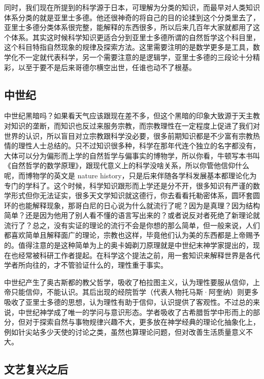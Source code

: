 \documentclass[]{tufte-book}
\begin{document}
同时，我们现在所提到的科学源于日本，可理解为分类的知识，而最早对人类知识体系分类的就是亚里士多德。他还很神奇的将自己的目的论揉到这个分类里去了，亚里士多德分类体系很完整，能解释的东西很多，所以后来几百年大家就都用了这个体系。其实这时候科学知识更适合分到亚里士多德所谓的自然哲学这个科目里，这个科目特指自然现象的规律及探索方法。这里需要注明的是数学更多是工具，数学化不一定就代表科学，另一个需要注意的是逻辑学，亚里士多德的三段论十分精彩，以至于要不是后来哥德尔横空出世，任谁也动不了根基。

\hypertarget{ux4e2dux4e16ux7eaa}{%
\subsection{中世纪}\label{ux4e2dux4e16ux7eaa}}

中世纪黑暗吗？如果看天气应该跟现在差不多，但这个黑暗的印象大致源于天主教对知识的垄断，而知识也反过来服务宗教，而宗教理性在一定程度上促进了我们对世界的认识，所以盲目对立宗教跟科学没必要，很多前期知识都是不少富有宗教热情的理性人士总结的。只不过知识很多种，科学在那年代连个独立的名字都没有，大体可以分为偏形而上学的自然哲学与偏事实的博物学，所以你看，牛顿写本书叫《自然哲学的数学原理》，跟现代意义上的科学没啥关系，所以你管他信仰什么呢，而博物学的英文是 nature history，只是后来伴随各学科发展基本都理论化为专门的学科了。这个时候，科学知识跟形而上学还是分不开，很多知识有严谨的数学形式但你无法证实，很多天文学知识就这德行，你去看看托勒密体系，圆环套圆环的也能解释现象，那哥白尼的日心说为什么就流行了呢？因为是真理？因为结构简单？还是因为他用了别人看不懂的语言写出来的？或者说反对者死绝了新理论就流行了？总之，没有实证的理论的流行不会是你想的那么简单，但一般来说，人们都喜欢简单且解释面广的理论，宗教也这样，毕竟他们认为美的东西都是上帝赐予的。值得注意的是这种简单为上的奥卡姆剃刀原理就是中世纪末神学家提出的，现在也经常被科研工作者提起。在科学这个提法之前，用一套知识来解释世界是各代学者所向往的，才不管验证什么的，理性重于事实。

中世纪产生了奥古斯都的教父哲学，吸收了柏拉图主义，认为理性要服从信仰，上帝只能信仰，不能认识。其后出现的经院哲学（代表人物托马斯·阿奎纳）则更多吸收了亚里士多德的思想，认为理性有助于信仰，认识提供了客观性。不过总的来说，中世纪神学成了唯一的学问与意识形态。学者吸收了古希腊哲学中形而上的部分，但对于探索自然与事物规律兴趣不大，更多放在神学经典的理论化抽象化上，例如针尖站多少天使的讨论之类，虽然也算理论问题，但对改善生活质量意义不大。

\hypertarget{ux6587ux827aux590dux5174ux4e4bux540e}{%
\subsection{文艺复兴之后}\label{ux6587ux827aux590dux5174ux4e4bux540e}}
\end{document}
